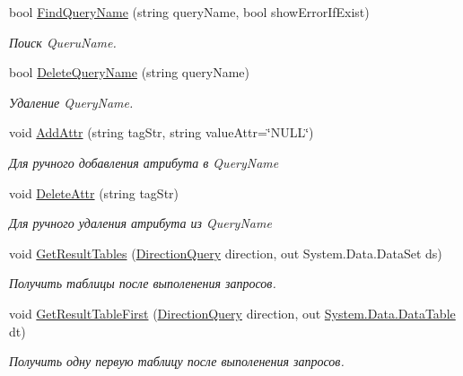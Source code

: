 \begin{DoxyCompactItemize}
\begin{DoxyCompactList}
\end{DoxyCompactList}\item 
bool \mbox{\hyperlink{class_f_b_a_1_1_object_ref_aa585836d091b26d68245f2ed81b2b3b0}{Find\+Query\+Name}} (string query\+Name, bool show\+Error\+If\+Exist)
\begin{DoxyCompactList}\small\item\em Поиск Queru\+Name. \end{DoxyCompactList}\item 
bool \mbox{\hyperlink{class_f_b_a_1_1_object_ref_aa0b11cb7eec5d93930252105e2d571a3}{Delete\+Query\+Name}} (string query\+Name)
\begin{DoxyCompactList}\small\item\em Удаление Query\+Name. \end{DoxyCompactList}\item 
void \mbox{\hyperlink{class_f_b_a_1_1_object_ref_a1a4bb51c6ca978071882d8a46ee45ba0}{Add\+Attr}} (string tag\+Str, string value\+Attr=\char`\"{}N\+U\+LL\char`\"{})
\begin{DoxyCompactList}\small\item\em Для ручного добавления атрибута в Query\+Name \end{DoxyCompactList}\item 
void \mbox{\hyperlink{class_f_b_a_1_1_object_ref_accd3d673b6732103abd0e1677b4728cd}{Delete\+Attr}} (string tag\+Str)
\begin{DoxyCompactList}\small\item\em Для ручного удаления атрибута из Query\+Name \end{DoxyCompactList}\item 
void \mbox{\hyperlink{class_f_b_a_1_1_object_ref_adabc73cda24d045c84b8296012a3c13c}{Get\+Result\+Tables}} (\mbox{\hyperlink{namespace_f_b_a_a6ff7d5c242d98046d1980715b06d7300}{Direction\+Query}} direction, out System.\+Data.\+Data\+Set ds)
\begin{DoxyCompactList}\small\item\em Получить таблицы после выполенения запросов. \end{DoxyCompactList}\item 
void \mbox{\hyperlink{class_f_b_a_1_1_object_ref_aff59f834ef3b759c10048d40866d9369}{Get\+Result\+Table\+First}} (\mbox{\hyperlink{namespace_f_b_a_a6ff7d5c242d98046d1980715b06d7300}{Direction\+Query}} direction, out \mbox{\hyperlink{_sys_static_8cs_a6542cfcff2f8e81f06ade15aa0bfe2b7}{System.\+Data.\+Data\+Table}} dt)
\begin{DoxyCompactList}\small\item\em Получить одну первую таблицу после выполенения запросов. \end{DoxyCompactList}\item 

\end{DoxyCompactItemize}
